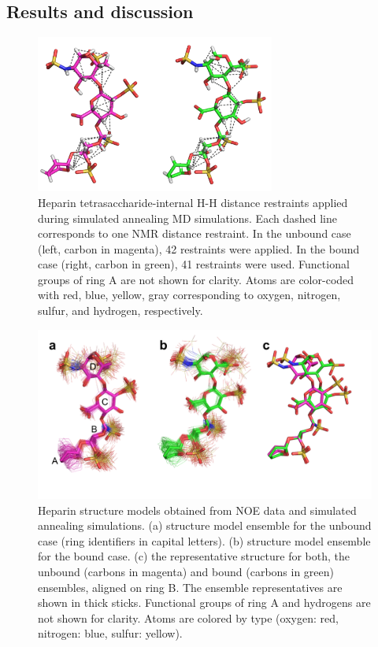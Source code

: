 \subsection{Results and discussion}

\begin{figure}
\centering
\includegraphics[width=0.7\textwidth]{gfx/nmr/two_cases_dashed_lines_distances.png}
\caption[]{
Heparin tetrasaccharide-internal H-H distance restraints applied during
simulated annealing MD simulations. Each dashed line corresponds to one NMR
distance restraint. In the unbound case (left, carbon in magenta), 42
restraints were applied. In the bound case (right, carbon in green), 41
restraints were used. Functional groups of ring A are not shown for clarity.
Atoms are color-coded with red, blue, yellow, gray corresponding to oxygen,
nitrogen, sulfur, and hydrogen, respectively.
}
\label{fig:nmr:hp_dashed_lines_distances}
\end{figure}

\begin{figure}
\centering
\includegraphics[width=\textwidth]{gfx/nmr/Figure_07_bound_vs_free_three_panels_05.png}
\caption[]{
Heparin structure models obtained from NOE data and simulated annealing
simulations. (a) structure model ensemble for the unbound case (ring identifiers
in capital letters). (b) structure model ensemble for the bound case. (c) the
representative structure for both, the unbound (carbons in magenta) and bound
(carbons in green) ensembles, aligned on ring B. The ensemble representatives
are shown in thick sticks. Functional groups of ring A and hydrogens are not
shown for clarity. Atoms are colored by type (oxygen: red, nitrogen: blue,
sulfur: yellow).
}
\label{fig:nmr:hp_ensembles_representatives}
\end{figure}


